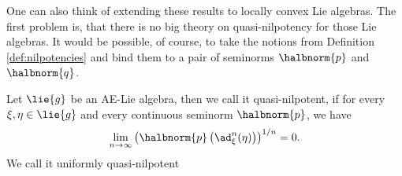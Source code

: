 \documentclass[
11pt,                          %
english                        %
]{article}
\begin{document}
One can also think of extending these results to locally convex Lie algebras. The 
first problem is, that there is no big theory on quasi-nilpotency for those Lie 
algebras. It would be possible, of course, to take the notions from Definition 
\ref{def:nilpotencies} and bind them to a pair of seminorms $\halbnorm{p}$ and 
$\halbnorm{q}$.
\begin{definition}
	Let $\lie{g}$ be an AE-Lie algebra, then we call it quasi-nilpotent, if for 
	every $\xi, \eta \in \lie{g}$ and every continuous seminorm $\halbnorm{p}$,
	we have
	\begin{equation}
		\lim\limits_{n \rightarrow \infty}
		\left(
			\halbnorm{p}
			\left(
				\ad_\xi^n(\eta)
			\right)
		\right)^{1/n}
		=
		0.
	\end{equation}
	We call it uniformly quasi-nilpotent
\end{definition}
\end{document}
